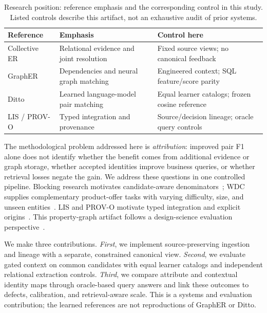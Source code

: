 \documentclass[conference,letterpaper]{IEEEtran}
\begin{document}
\begin{table}[t]
\caption{Research position: reference emphasis and the corresponding control in this study. Listed controls describe this artifact, not an exhaustive audit of prior systems.}
\label{tab:position}
\centering\small
\setlength{\tabcolsep}{3pt}
\begin{tabularx}{\columnwidth}{@{}p{}YY@{}}
\toprule
Reference & Emphasis & Control here\\
\midrule
Collective ER~\cite{bhattacharya2007} & Relational evidence and joint resolution & Fixed source views; no canonical feedback\\
GraphER~\cite{grapher2025} & Dependencies and neural graph matching & Engineered context; SQL feature/score parity\\
Ditto~\cite{ditto2020} & Learned language-model pair matching & Equal learner catalogs; frozen cosine reference\\
LIS / PROV-O~\cite{lis2023,provo2013} & Typed integration and provenance & Source/decision lineage; oracle query controls\\
\bottomrule
\end{tabularx}
\end{table}

The methodological problem addressed here is \emph{attribution}: improved pair F1 alone does not identify whether the benefit comes from additional evidence or graph storage, whether accepted identities improve business queries, or whether retrieval losses negate the gain. We address these questions in one controlled pipeline. Blocking research motivates candidate-aware denominators~\cite{blocking2020}; WDC supplies complementary product-offer tasks with varying difficulty, size, and unseen entities~\cite{wdc2024}. LIS and PROV-O motivate typed integration and explicit origins~\cite{lis2023,provo2013}. This property-graph artifact follows a design-science evaluation perspective~\cite{hevner2004}.

We make three contributions. \emph{First}, we implement source-preserving ingestion and lineage with a separate, constrained canonical view. \emph{Second}, we evaluate gated context on common candidates with equal learner catalogs and independent relational extraction controls. \emph{Third}, we compare attribute and contextual identity maps through oracle-based query answers and link these outcomes to defects, calibration, and retrieval-aware scale. This is a systems and evaluation contribution; the learned references are not reproductions of GraphER or Ditto.
\end{document}
